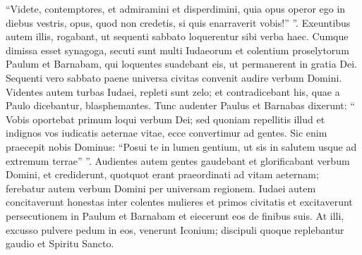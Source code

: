 \begin{biblechapter}
\begin{biblechapter}
\begin{biblechapter}
\begin{biblechapter}
\begin{biblechapter}
\begin{biblechapter}
\begin{biblechapter}
\begin{biblechapter}
\begin{biblechapter}
\begin{biblechapter}
\begin{biblechapter}
\begin{biblechapter}
\begin{biblechapter}
 \verse “Videte, contemptores,
 et admiramini et disperdimini,
 quia opus operor ego in diebus vestris,
 opus, quod non credetis, si quis enarraverit vobis!” ”.
 \verse Exeuntibus autem illis, rogabant, ut sequenti sabbato loquerentur sibi verba haec. 
\verse Cumque dimissa esset synagoga, secuti sunt multi Iudaeorum et colentium proselytorum Paulum et Barnabam, qui loquentes suadebant eis, ut permanerent in gratia Dei.
 \verse Sequenti vero sabbato paene universa civitas convenit audire verbum Domini. 
\verse Videntes autem turbas Iudaei, repleti sunt zelo; et contradicebant his, quae a Paulo dicebantur, blasphemantes.
 \verse Tunc audenter Paulus et Barnabas dixerunt: “ Vobis oportebat primum loqui verbum Dei; sed quoniam repellitis illud et indignos vos iudicatis aeternae vitae, ecce convertimur ad gentes. 
\verse Sic enim praecepit nobis Dominus:
 “Posui te in lumen gentium,
 ut sis in salutem usque ad extremum terrae” ”.
 \verse Audientes autem gentes gaudebant et glorificabant verbum Domini, et crediderunt, quotquot erant praeordinati ad vitam aeternam; 
\verse ferebatur autem verbum Domini per universam regionem. 
\verse Iudaei autem concitaverunt honestas inter colentes mulieres et primos civitatis et excitaverunt persecutionem in Paulum et Barnabam et eiecerunt eos de finibus suis. 
\verse At illi, excusso pulvere pedum in eos, venerunt Iconium; 
\verse discipuli quoque replebantur gaudio et Spiritu Sancto.
 

\end{biblechapter}
\end{biblechapter}
\end{biblechapter}
\end{biblechapter}
\end{biblechapter}
\end{biblechapter}
\end{biblechapter}
\end{biblechapter}
\end{biblechapter}
\end{biblechapter}
\end{biblechapter}
\end{biblechapter}
\end{biblechapter}
